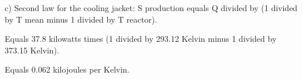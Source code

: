 c) Second law for the cooling jacket:  
S production equals Q divided by (1 divided by T mean minus 1 divided by T reactor).  

Equals 37.8 kilowatts times (1 divided by 293.12 Kelvin minus 1 divided by 373.15 Kelvin).  

Equals 0.062 kilojoules per Kelvin.